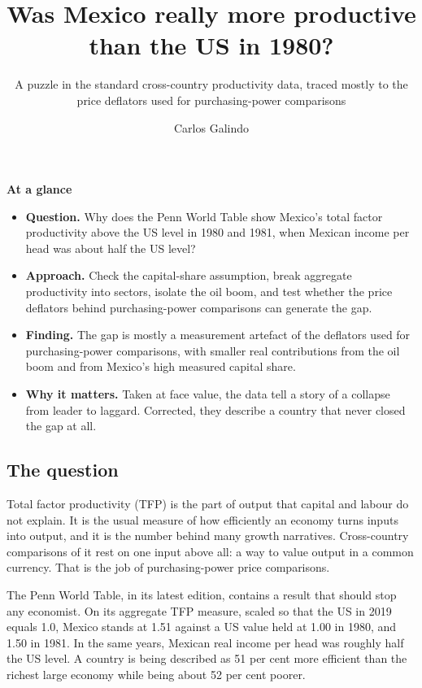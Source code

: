 \documentclass[
  british,
  a4paper,
]{article}
\title{Was Mexico really more productive than the US in 1980?}
\subtitle{A puzzle in the standard cross-country productivity data,
traced mostly to the price deflators used for purchasing-power
comparisons}
\author{Carlos Galindo}
\date{}
\providecommand{\tightlist}{%
  \setlength{\itemsep}{0pt}\setlength{\parskip}{0pt}}
\begin{document}
\maketitle


\begin{tcolorbox}[enhanced jigsaw, arc=.35mm, bottomrule=.15mm, breakable, colback=white, colframe=quarto-callout-note-color-frame, left=2mm, leftrule=.75mm, opacityback=0, rightrule=.15mm, toprule=.15mm]

\vspace{-3mm}\textbf{At a glance}\vspace{3mm}

\begin{itemize}
\tightlist
\item
  \textbf{Question.} Why does the Penn World Table show Mexico's total
  factor productivity above the US level in 1980 and 1981, when Mexican
  income per head was about half the US level?
\item
  \textbf{Approach.} Check the capital-share assumption, break aggregate
  productivity into sectors, isolate the oil boom, and test whether the
  price deflators behind purchasing-power comparisons can generate the
  gap.
\item
  \textbf{Finding.} The gap is mostly a measurement artefact of the
  deflators used for purchasing-power comparisons, with smaller real
  contributions from the oil boom and from Mexico's high measured
  capital share.
\item
  \textbf{Why it matters.} Taken at face value, the data tell a story of
  a collapse from leader to laggard. Corrected, they describe a country
  that never closed the gap at all.
\end{itemize}

\end{tcolorbox}

\subsection{The question}\label{the-question}

Total factor productivity (TFP) is the part of output that capital and
labour do not explain. It is the usual measure of how efficiently an
economy turns inputs into output, and it is the number behind many
growth narratives. Cross-country comparisons of it rest on one input
above all: a way to value output in a common currency. That is the job
of purchasing-power price comparisons.

The Penn World Table, in its latest edition, contains a result that
should stop any economist. On its aggregate TFP measure, scaled so that
the US in 2019 equals 1.0, Mexico stands at 1.51 against a US value held
at 1.00 in 1980, and 1.50 in 1981. In the same years, Mexican real
income per head was roughly half the US level. A country is being
described as 51 per cent more efficient than the richest large economy
while being about 52 per cent poorer.
\end{document}
